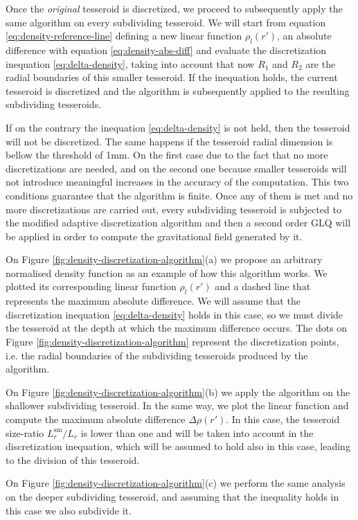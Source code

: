 \documentclass[extra]{gji}
\begin{document}
Once the \emph{original} tesseroid is discretized, we proceed to
subsequently apply the same algorithm on every subdividing tesseroid.
We will start from equation \ref{eq:density-reference-line} defining a
new linear function $\rho_l(r')$, an absolute difference with equation
\ref{eq:density-abs-diff} and evaluate the discretization inequation
\ref{eq:delta-density}, taking into account that now $R_1$ and $R_2$
are the radial boundaries of this smaller tesseroid.
If the inequation holds, the current tesseroid is discretized and the
algorithm is subsequently applied to the resulting subdividing tesseroids.

If on the contrary the inequation \ref{eq:delta-density} is not held,
then the tesseroid will not be discretized.
The same happens if the tesseroid radial dimension is bellow the
threshold of 1mm.
On the first case due to the fact that no more discretizations are
needed, and on the second one because smaller tesseroids will not
introduce meaningful increases in the accuracy of the computation.
This two conditions guarantee that the algorithm is finite.
Once any of them is met and no more discretizations are carried out,
every subdividing tesseroid is subjected to the modified adaptive
discretization algorithm and then a second order GLQ will be applied in
order to compute the gravitational field generated by it.

On Figure \ref{fig:density-discretization-algorithm}(a) we propose an
arbitrary normalised density function as an example of how this
algorithm works.
We plotted its corresponding linear function $\rho_l(r')$ and a
dashed line that represents the maximum absolute difference.
We will assume that the discretization inequation
\ref{eq:delta-density} holds in this case, so we must divide the
tesseroid at the depth at which the maximum difference occurs.
The dots on Figure \ref{fig:density-discretization-algorithm}
represent the discretization points, i.e. the radial boundaries of the
subdividing tesseroids produced by the algorithm.

On Figure \ref{fig:density-discretization-algorithm}(b) we apply the
algorithm on the shallower subdividing tesseroid.
In the same way, we plot the linear function and compute the maximum
absolute difference $\Delta \rho (r')$.
In this case, the tesseroid size-ratio $L_r^\text{sm}/L_r$ is lower
than one and will be taken into account in the discretization
inequation, which will be assumed to hold also in this case, leading to
the division of this tesseroid.

On Figure \ref{fig:density-discretization-algorithm}(c) we perform the
same analysis on the deeper subdividing tesseroid, and assuming that the
inequality holds in this case we also subdivide it.
\end{document}
